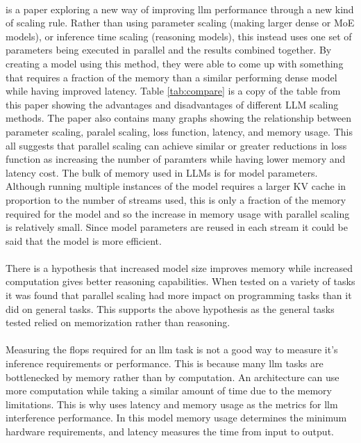 \paragraph{}\autocite{chen_parallel_2025} is a paper exploring a new way of improving \acrshort{llm} performance through a new kind of scaling rule. Rather than using parameter scaling (making larger dense or MoE models), or inference time scaling (reasoning models), this instead uses one set of parameters being executed in parallel and the results combined together. By creating a model using this method, they were able to come up with something that requires a fraction of the memory than a similar performing dense model while having improved latency. Table \ref{tab:compare} is a copy of the table from this paper showing the advantages and disadvantages of different LLM scaling methods. The paper also contains many graphs showing the relationship between parameter scaling, paralel scaling, loss function, latency, and memory usage. This all suggests that parallel scaling can achieve similar or greater reductions in loss function as increasing the number of paramters while having lower memory and latency cost. The bulk of memory used in LLMs is for model parameters. Although running multiple instances of the model requires a larger KV cache in proportion to the number of streams used, this is only a fraction of the memory required for the model and so the increase in memory usage with parallel scaling is relatively small. Since model parameters are reused in each stream it could be said that the model is more efficient.

\paragraph{}There is a hypothesis that increased model size improves memory while increased computation gives better reasoning capabilities. When tested on a variety of tasks it was found that parallel scaling had more impact on programming tasks than it did on general tasks. This supports the above hypothesis as the general tasks tested relied on memorization rather than reasoning.

\paragraph{}Measuring the flops required for an \acrshort{llm} task is not a good way to measure it's inference requirements or performance. This is because many \acrshort{llm} tasks are bottlenecked by memory rather than by computation. An architecture can use more computation while taking a similar amount of time due to the memory limitations. This is why \cite{chen_parallel_2025} uses latency and memory usage as the metrics for \acrshort{llm} interference performance. In this model memory usage determines the minimum hardware requirements, and latency measures the time from input to output.


